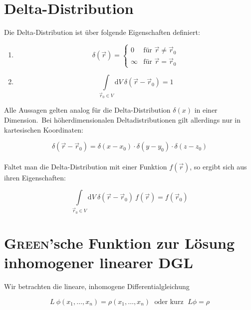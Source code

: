 \section{Delta-Distribution}

Die Delta-Distribution ist über folgende Eigenschaften definiert:

\begin{enumerate}
\item
\begin{equation*}
\delta(\vec{r}) = \begin{cases}
0 & \text{für }\vec{r}\neq\vec{r}_0\\
\infty & \text{für } \vec{r} = \vec{r}_0
\end{cases}
\end{equation*}

\item
\begin{equation*}
\int\limits_{\vec{r}_0\in V}\mathrm{d}V \ \delta({\vec{r}-\vec{r}_0}) = 1
\end{equation*}
\end{enumerate}

Alle Aussagen gelten analog für die Delta-Distribution $\delta(x)$ in einer Dimension.\
Bei höherdimensionalen Deltadistributionen gilt allerdings nur in kartesischen Koordinaten:

\begin{equation*}
\delta(\vec{r} - \vec{r}_0) = \delta(x-x_0)\cdot\delta(y-y_0)\cdot\delta(z-z_0)
\end{equation*}
\ \\
Faltet man die Delta-Distribution mit einer Funktion $f(\vec{r})$, so ergibt sich aus ihren Eigenschaften:

\begin{equation*}
\int\limits_{\vec{r}_0\in V}\mathrm{d}V \ \delta({\vec{r}-\vec{r}_0}) \ f(\vec{r}) = f(\vec{r}_0)
\end{equation*}

\section{\textsc{Green}'sche Funktion zur Lösung inhomogener linearer DGL}

Wir betrachten die lineare, inhomogene Differentialgleichung

\begin{equation*}
L \ \phi (x_1,\dotsc,x_n) = \rho (x_1,\dotsc,x_n) \; \text{ oder kurz } \; L\phi = \rho
\end{equation*}

